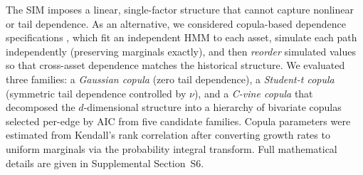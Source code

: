 The SIM imposes a linear, single-factor structure that cannot capture nonlinear or tail dependence. As an alternative, we considered copula-based dependence specifications \cite{embrechts_copulas_2002, cherubini_copula_2004}, which fit an independent HMM to each asset, simulate each path independently (preserving marginals exactly), and then \emph{reorder} simulated values so that cross-asset dependence matches the historical structure. We evaluated three families: a \textit{Gaussian copula} (zero tail dependence), a \textit{Student-t copula} (symmetric tail dependence controlled by $\nu$), and a \textit{C-vine copula} \cite{aas_pair_2009} that decomposed the $d$-dimensional structure into a hierarchy of bivariate copulas selected per-edge by AIC from five candidate families. Copula parameters were estimated from Kendall's rank correlation after converting growth rates to uniform marginals via the probability integral transform. Full mathematical details are given in Supplemental Section~S6.